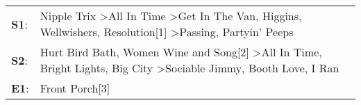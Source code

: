 \begin{supertabular}{p{0.03\textwidth}p{0.92\textwidth}}
 \textbf{S1}:  &  Nipple Trix\textsuperscript{} \textgreater \enspace All In Time\textsuperscript{} \textgreater \enspace Get In The Van\textsuperscript{}, \enspace Higgins\textsuperscript{}, \enspace Wellwishers\textsuperscript{}, \enspace Resolution[1]\textsuperscript{} \textgreater \enspace Passing\textsuperscript{}, \enspace Partyin' Peeps\textsuperscript{}  \enspace  \\
 \textbf{S2}:  &                                Hurt Bird Bath\textsuperscript{}, \enspace Women Wine and Song[2]\textsuperscript{} \textgreater \enspace All In Time\textsuperscript{}, \enspace Bright Lights, Big City\textsuperscript{} \textgreater \enspace Sociable Jimmy\textsuperscript{}, \enspace Booth Love\textsuperscript{}, \enspace I Ran\textsuperscript{}  \enspace  \\
 \textbf{E1}:  &                                                                                                                                                                                                                                                                                                                           Front Porch[3]\textsuperscript{}  \enspace  \\
\end{supertabular}
